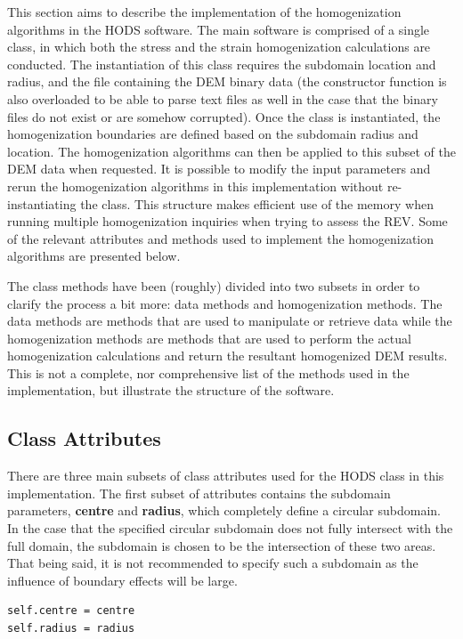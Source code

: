This section aims to describe the implementation of the homogenization algorithms in the HODS software. The main software is comprised of a single class, in which both the stress and the strain homogenization calculations are conducted. The instantiation of this class requires the subdomain location and radius, and the file containing the DEM binary data (the constructor function is also overloaded to be able to parse text files as well in the case that the binary files do not exist or are somehow corrupted). Once the class is instantiated, the homogenization boundaries are defined based on the subdomain radius and location. The homogenization algorithms can then be applied to this subset of the DEM data when requested. It is possible to modify the input parameters and rerun the homogenization algorithms in this implementation without re-instantiating the class. This structure makes efficient use of the memory when running multiple homogenization inquiries when trying to assess the REV. Some of the relevant attributes and methods used to implement the homogenization algorithms are presented below. 

The class methods have been (roughly) divided into two subsets in order to clarify the process a bit more: data methods and homogenization methods. The data methods are methods that are used to manipulate or retrieve data while the homogenization methods are methods that are used to perform the actual homogenization calculations and return the resultant homogenized DEM results. This is not a complete, nor comprehensive list of the methods used in the implementation, but illustrate the structure of the software.

\subsection{Class Attributes}

There are three main subsets of class attributes used for the HODS class in this implementation. The first subset of attributes contains the subdomain parameters, \textbf{centre} and \textbf{radius}, which completely define a circular subdomain. In the case that the specified circular subdomain does not fully intersect with the full domain, the subdomain is chosen to be the intersection of these two areas. That being said, it is not recommended to specify such a subdomain as the influence of boundary effects will be large.

\begin{lstlisting}[frame=single] 
self.centre = centre
self.radius = radius
\end{lstlisting}

